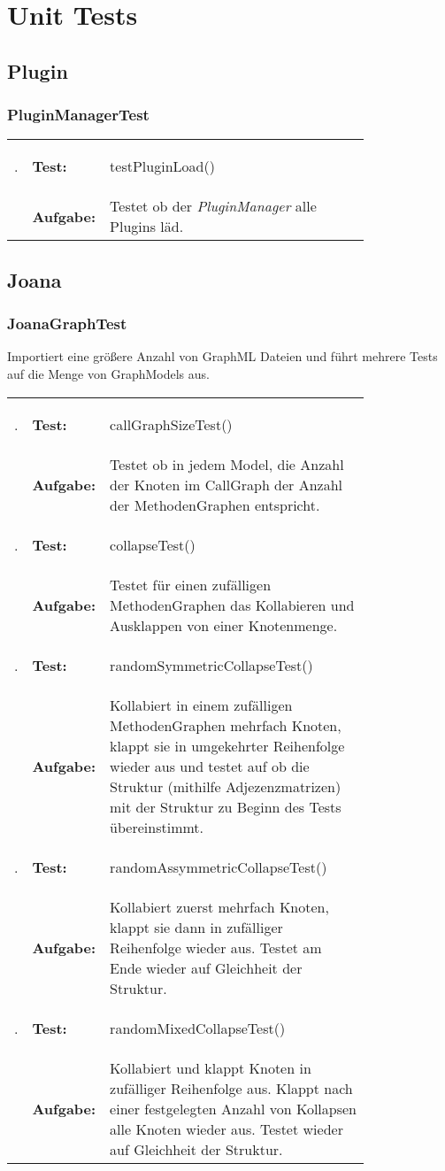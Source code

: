 \chapter{Unit Tests}
\label{ch:unittests}

\newcommand\test[2]{\textbf{\arabic{tnr}}\addtocounter{tnr}{1}. & \textbf{Test:} & #1 \\ & \textbf{Aufgabe:} & #2 \\ [1ex] }

\section{Plugin}
\subsection{PluginManagerTest}
\setcounter{tnr}{1}
\begin{longtable}{llp{0.8\linewidth}}
	\test{testPluginLoad()}{Testet ob der \textit{PluginManager} alle Plugins läd.}
\end{longtable}

\section{Joana}
\subsection{JoanaGraphTest}
Importiert eine größere Anzahl von GraphML Dateien und führt mehrere Tests auf die Menge von GraphModels aus.
\setcounter{tnr}{1}
\begin{longtable}{llp{0.8\linewidth}}
	\test{callGraphSizeTest()}{Testet ob in jedem Model, die Anzahl der Knoten im CallGraph der Anzahl der MethodenGraphen entspricht.}
	\test{collapseTest()}{Testet für einen zufälligen MethodenGraphen das Kollabieren und Ausklappen von einer Knotenmenge.}
	\test{randomSymmetricCollapseTest()}{Kollabiert in einem zufälligen MethodenGraphen mehrfach Knoten, klappt sie in umgekehrter Reihenfolge wieder aus und testet auf ob die Struktur (mithilfe Adjezenzmatrizen) mit der Struktur zu Beginn des Tests übereinstimmt.}
	\test{randomAssymmetricCollapseTest()}{Kollabiert zuerst mehrfach Knoten, klappt sie dann in zufälliger Reihenfolge wieder aus. Testet am Ende wieder auf Gleichheit der Struktur.}
	\test{randomMixedCollapseTest()}{Kollabiert und klappt Knoten in zufälliger Reihenfolge aus. Klappt nach einer festgelegten Anzahl von Kollapsen alle Knoten wieder aus. Testet wieder auf Gleichheit der Struktur.}
\end{longtable}

